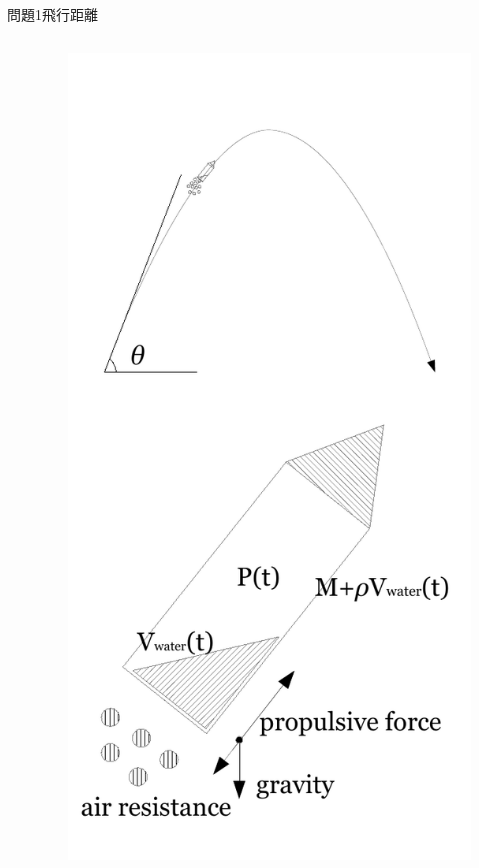 \documentclass[dvipdfmx]{beamer}
\begin{document}
\begin{frame}{問題1}{飛行距離}
\begin{columns}[t]
\begin{column}{0.7\textwidth}
\end{column}
\begin{column}{0.3\textwidth}
\begin{figure}[htbp]
    \centering
    \includegraphics[bb=0mm 0mm 100.0mm 170.0mm, scale=0.35, type=pdf]{img/problem1.pdf}
\end{figure}
\end{column}
\end{columns}
\end{frame}
\end{document}
